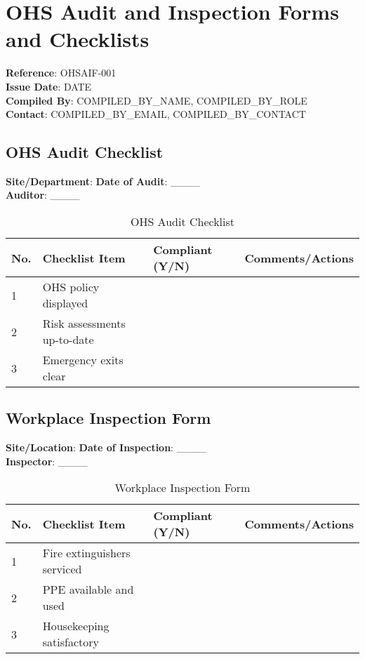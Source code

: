 \documentclass[11pt]{article}
\newcommand{\docTitle}{OHS Audit and Inspection Forms and Checklists}
\newcommand{\refNumber}{OHSAIF-001}
\newcommand{\issueDate}{{{DATE}}}
\newcommand{\location}{}
\newcommand{\compilerName}{{{COMPILED_BY_NAME}}}
\newcommand{\compilerRole}{{{COMPILED_BY_ROLE}}}
\newcommand{\compilerEmail}{{{COMPILED_BY_EMAIL}}}
\newcommand{\compilerPhone}{{{COMPILED_BY_CONTACT}}}
\begin{document}
\section*{\docTitle}
\textbf{Reference}: \refNumber \\
\textbf{Issue Date}: \issueDate \\
\textbf{Compiled By}: \compilerName, \compilerRole \\
\textbf{Contact}: \compilerEmail, \compilerPhone

\subsection*{OHS Audit Checklist}

\textbf{Site/Department}: \location \textbf{Date of Audit}: \_\_\_\_ \\
\textbf{Auditor}: \_\_\_\_

\begin{table}[h]
    \centering
    \begin{tabular}{p{1cm}p{5cm}p{2cm}p{3cm}}
        \toprule
        \textbf{No.} & \textbf{Checklist Item} & \textbf{Compliant (Y/N)} & \textbf{Comments/Actions} \\
        \midrule
        1 & OHS policy displayed & & \\
        2 & Risk assessments up-to-date & & \\
        3 & Emergency exits clear & & \\
        \bottomrule
    \end{tabular}
    \caption{OHS Audit Checklist}
\end{table}

\subsection*{Workplace Inspection Form}

\textbf{Site/Location}: \location \textbf{Date of Inspection}: \_\_\_\_ \\
\textbf{Inspector}: \_\_\_\_

\begin{table}[h]
    \centering
    \begin{tabular}{p{1cm}p{5cm}p{2cm}p{3cm}}
        \toprule
        \textbf{No.} & \textbf{Checklist Item} & \textbf{Compliant (Y/N)} & \textbf{Comments/Actions} \\
        \midrule
        1 & Fire extinguishers serviced & & \\
        2 & PPE available and used & & \\
        3 & Housekeeping satisfactory & & \\
        \bottomrule
    \end{tabular}
    \caption{Workplace Inspection Form}
\end{table}
\end{document}
